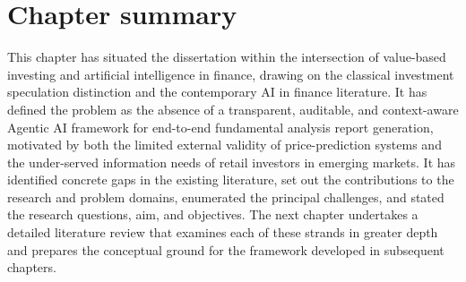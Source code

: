 \section{Chapter summary}
\label{sec:summary}

This chapter has situated the dissertation within the intersection of value-based investing and artificial intelligence in finance, drawing on the classical investment speculation distinction and the contemporary AI in finance literature. It has defined the problem as the absence of a transparent, auditable, and context-aware Agentic AI framework for end-to-end fundamental analysis report generation, motivated by both the limited external validity of price-prediction systems and the under-served information needs of retail investors in emerging markets. It has identified concrete gaps in the existing literature, set out the contributions to the research and problem domains, enumerated the principal challenges, and stated the research questions, aim, and objectives. The next chapter undertakes a detailed literature review that examines each of these strands in greater depth and prepares the conceptual ground for the framework developed in subsequent chapters.

